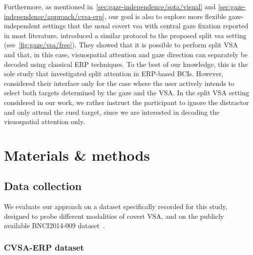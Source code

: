 Furthermore, as mentioned in~\autoref{sec:gaze-independence/sota/visual} and
\autoref{sec:gaze-independence/approach/cvsa-erp},
our goal is also to explore more flexible gaze-independent settings that the
usual covert \ac{vsa} with central gaze fixation reported in most literature.
\textcite{Frenzel2011} introduced a similar protocol to the proposed split
\ac{vsa} setting (see~\autoref{fig:gaze/vsa/free}).
They showed that it is possible to perform split VSA and that, in this
case, visuospatial attention and gaze direction can separately be decoded using
classical ERP techniques.
To the best of our
knowledge, this is the sole study that investigated split attention in ERP-based BCIs.
However, \textcite{Frenzel2011} considered their interface only for the case
where the user actively intends to select both targets determined by the gaze
and the VSA.
In the split VSA setting considered in our work, we rather instruct the participant to ignore
the distractor and only attend the cued target, since we are interested in
decoding the visuospatial attention only.

\section{Materials \& methods}

\subsection{Data collection}
We evaluate our approach on a dataset specifically recorded for this study, designed to
probe different modalities of covert VSA, and on the publicly available
BNCI2014-009 dataset~\cite{Aloise2012a}.

\subsubsection{CVSA-ERP dataset}
\label{sec:covert-align/stimulation}

